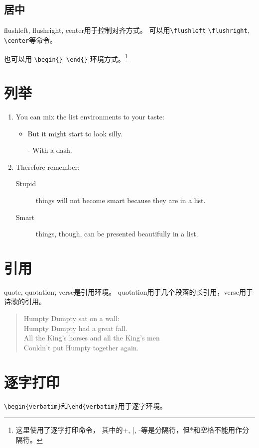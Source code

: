 \documentclass[12pt, a4paper, onecolumn, notitlepage]{article}
\begin{document}
\subsection{居中}
flushleft, flushright, center用于控制对齐方式。
可以用\verb+\flushleft+ \verb|\flushright|, \verb-\center-等命令。

也可以用 \verb&\begin{} \end{}& 环境方式。\footnote{这里使用了逐字打印命令，
其中的+, |, -等是分隔符，但*和空格不能用作分隔符。}
\section{列举}
\flushleft
\begin{enumerate}
 \item You can mix the list environments to your taste:
       \begin{itemize}
        \item But it might start to look silly.
        \item[-] With a dash.
       \end{itemize}
 \item Therefore remember:
       \begin{description}
        \item[Stupid] things will not become smart because they are in a list.
        \item[Smart] things, though, can be presented beautifully in a list.
       \end{description}
\end{enumerate}
\section{引用}
quote, quotation, verse是引用环境。
quotation用于几个段落的长引用，verse用于诗歌的引用。
\begin{verse}
Humpty Dumpty sat on a wall:\\
Humpty Dumpty had a great fall.\\
All the King’s horses and all
the King’s men\\
Couldn’t put Humpty together again.
\end{verse}
\section{逐字打印}
\verb+\begin{verbatim}+和\verb+\end{verbatim}+用于逐字环境。
\end{document}
